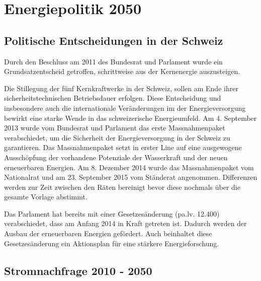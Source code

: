 \chapter{Energiepolitik 2050}

\section{Politische Entscheidungen in der Schweiz}
Durch den Beschluss am 2011 des Bundesrat und Parlament wurde ein Grundsatzentscheid getroffen,
schrittweise aus der Kernenergie auszusteigen\cite{bfe_energiestrategie}. 
\par
Die Stillegung der fünf Kernkraftwerke in der Schweiz, sollen am Ende ihrer sicherheitstechnischen
Betriebsdauer erfolgen. Diese Entscheidung und insbesondere auch die internationale Veränderungen 
im der Energieversorgung bewirkt eine starke Wende in das schweizerische Energieumfeld.
Am 4. September 2013 wurde vom Bundesrat und Parlament das erste Massnahmenpaket verabschiedet, um
die Sicherheit der Energieversorgung in der Schweiz zu garantieren. Das Massnahmenpaket setzt in erster
Line auf eine ausgewogene Ausschöpfung der vorhandene Potenziale der Wasserkraft und der neuen erneuerbaren
Energien. Am 8. Dezember 2014 wurde das Massnahmenpaket vom Nationalrat und am 23. September 2015 vom Ständerat
angenommen. Differenzen werden zur Zeit zwischen den Räten bereinigt bevor diese nochmals über die
gesamte Vorlage abstimmt. 
\par
Das Parlament hat bereits mit einer Gesetzesänderung (pa.lv. 12.400) verabschiedet, dass am Anfang 2014 in
Kraft getreten ist. Dadurch werden der Ausbau der erneuerbaren Energien gefördert. Auch beinhaltet
diese Gesetzesänderung ein Aktionsplan für eine stärkere Energieforschung.

\section{Stromnachfrage 2010 - 2050}


\section{}



